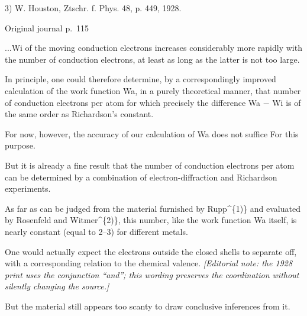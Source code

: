\documentclass[10pt]{article}
\newcommand{\origpage}[1]{\par\medskip\noindent\hfill{\small\color{notegray}Original journal p.~#1}\hfill\mbox{}\par\smallskip}
\begin{document}
\noindent\footnotesize 3) W. Houston, Ztschr. f. Phys. 48, p. 449, 1928.\par\normalsize
\origpage{115}
...Wi of the moving conduction electrons increases considerably more rapidly with the number of conduction electrons, at least as long as the latter is not too large.\par
In principle, one could therefore determine, by a correspondingly improved calculation of the work function Wa, in a purely theoretical manner, that number of conduction electrons per atom for which precisely the difference Wa − Wi is of the same order as Richardson’s constant.\par
For now, however, the accuracy of our calculation of Wa does not suffice For this purpose.\par
But it is already a fine result that the number of conduction electrons per atom can be determined by a combination of electron-diffraction and Richardson experiments.\par
As far as can be judged from the material furnished by Rupp\textasciicircum{}\{1)\} and evaluated by Rosenfeld and Witmer\textasciicircum{}\{2)\}, this number, like the work function Wa itself, is nearly constant (equal to 2–3) for different metals.\par
One would actually expect the electrons outside the closed shells to separate off, with a corresponding relation to the chemical valence. \textit{[Editorial note: the 1928 print uses the conjunction “and”; this wording preserves the coordination without silently changing the source.]}\par
But the material still appears too scanty to draw conclusive inferences from it.\par
\end{document}
